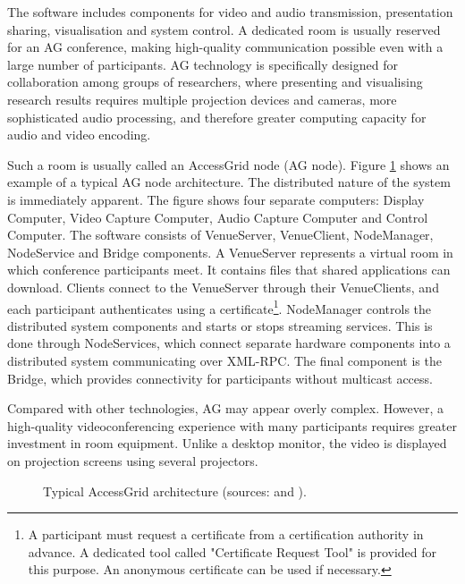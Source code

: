 The software includes components for video and audio transmission, presentation sharing, visualisation and system control. A dedicated room is usually reserved for an AG conference, making high-quality communication possible even with a large number of participants. AG technology is specifically designed for collaboration among groups of researchers, where presenting and visualising research results requires multiple projection devices and cameras, more sophisticated audio processing, and therefore greater computing capacity for audio and video encoding.

Such a room is usually called an AccessGrid node (AG node). Figure \ref{fig:ArchAccessGridDefault} shows an example of a typical AG node architecture. The distributed nature of the system is immediately apparent. The figure shows four separate computers: Display Computer, Video Capture Computer, Audio Capture Computer and Control Computer. The software consists of VenueServer, VenueClient, NodeManager, NodeService and Bridge components. A VenueServer represents a virtual room in which conference participants meet. It contains files that shared applications can download. Clients connect to the VenueServer through their VenueClients, and each participant authenticates using a certificate\footnote{A participant must request a certificate from a certification authority in advance. A dedicated tool called "Certificate Request Tool" is provided for this purpose. An anonymous certificate can be used if necessary.}. NodeManager controls the distributed system components and starts or stops streaming services. This is done through NodeServices, which connect separate hardware components into a distributed system communicating over XML-RPC. The final component is the Bridge, which provides connectivity for participants without multicast access.

Compared with other technologies, AG may appear overly complex. However, a high-quality videoconferencing experience with many participants requires greater investment in room equipment. Unlike a desktop monitor, the video is displayed on projection screens using several projectors.

\begin{figure}
\centering

\caption{Typical AccessGrid architecture (sources: \protect\cite{ArticleUVTMU-KomunikaceAGPoint} and \cite{childers00}).}
\label{fig:ArchAccessGridDefault}
\end{figure}


